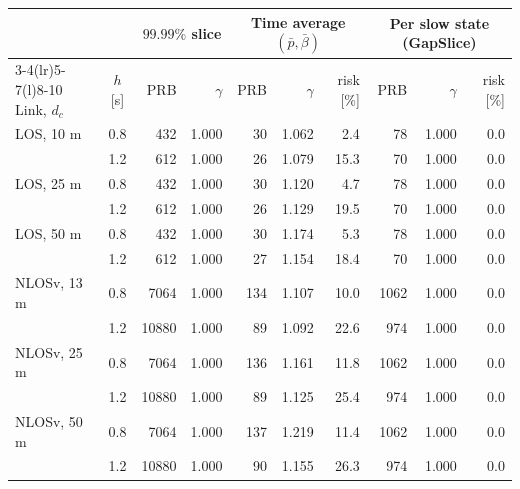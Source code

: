 \begin{tabular}{@{}l c r r r r r r r r@{}}
\toprule
 & & \multicolumn{2}{c}{$99.99\%$ slice} & \multicolumn{3}{c}{Time average $(\bar p,\bar\beta)$} & \multicolumn{3}{c}{Per slow state (GapSlice)}\\
\cmidrule(lr){3-4}\cmidrule(lr){5-7}\cmidrule(l){8-10}
Link, $d_c$ & $h$ [s] & PRB & $\gamma$ & PRB & $\gamma$ & risk [\%] & PRB & $\gamma$ & risk [\%]\\
\midrule
LOS, 10 m & 0.8 & 432 & 1.000 & 30 & 1.062 & 2.4 & 78 & 1.000 & 0.0\\
 & 1.2 & 612 & 1.000 & 26 & 1.079 & 15.3 & 70 & 1.000 & 0.0\\
LOS, 25 m & 0.8 & 432 & 1.000 & 30 & 1.120 & 4.7 & 78 & 1.000 & 0.0\\
 & 1.2 & 612 & 1.000 & 26 & 1.129 & 19.5 & 70 & 1.000 & 0.0\\
LOS, 50 m & 0.8 & 432 & 1.000 & 30 & 1.174 & 5.3 & 78 & 1.000 & 0.0\\
 & 1.2 & 612 & 1.000 & 27 & 1.154 & 18.4 & 70 & 1.000 & 0.0\\
NLOSv, 13 m & 0.8 & 7064 & 1.000 & 134 & 1.107 & 10.0 & 1062 & 1.000 & 0.0\\
 & 1.2 & 10880 & 1.000 & 89 & 1.092 & 22.6 & 974 & 1.000 & 0.0\\
NLOSv, 25 m & 0.8 & 7064 & 1.000 & 136 & 1.161 & 11.8 & 1062 & 1.000 & 0.0\\
 & 1.2 & 10880 & 1.000 & 89 & 1.125 & 25.4 & 974 & 1.000 & 0.0\\
NLOSv, 50 m & 0.8 & 7064 & 1.000 & 137 & 1.219 & 11.4 & 1062 & 1.000 & 0.0\\
 & 1.2 & 10880 & 1.000 & 90 & 1.155 & 26.3 & 974 & 1.000 & 0.0\\
\bottomrule
\end{tabular}
